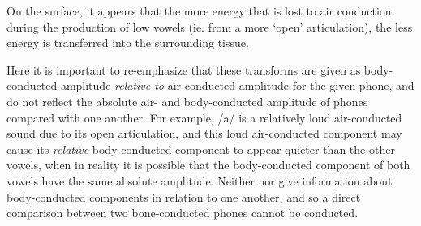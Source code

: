 \DIFdelend %
%
On the surface, it appears that the more energy that is lost to air conduction during the production of low vowels (ie. from a more `open' articulation), the less energy is transferred into the surrounding tissue.

Here it is important to re-emphasize that these transforms are given as body-conducted amplitude \textit{relative to} air-conducted amplitude for the given phone, and do not reflect the absolute air- and body-conducted amplitude of phones compared with one another.  For example, /a/ is a relatively loud air-conducted sound due to its open articulation, and this loud air-conducted component may cause its \textit{relative} body-conducted component to appear quieter than the other vowels, when in reality it is possible that the body-conducted component of both vowels have the same absolute amplitude.  Neither \cite{bekesy:60} nor \cite{reinfeldt:10} give information about body-conducted components in relation to one another, and so a direct comparison between two bone-conducted phones cannot be conducted.

\DIFdelbegin %
{%
}
\DIFdelend \DIFaddbegin {}

